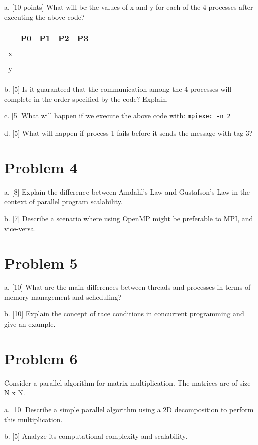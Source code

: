\documentclass{article}
\begin{document}
a. [10 points] What will be the values of x and y for each of the 4 processes after executing the above code?

\begin{tabular}{|c|c|c|c|c|}
\hline
 & P0 & P1 & P2 & P3 \\ \hline
x &  &  &  &  \\ \hline
y &  &  &  &  \\ \hline
\end{tabular}

b. [5]  Is it guaranteed that the communication among the 4 processes will complete in the order specified by the code?  Explain.

c. [5] What will happen if we execute the above code with: \texttt{mpiexec -n 2}

d. [5] What will happen if process 1 fails before it sends the message with tag 3?


\section*{Problem 4}
a. [8] Explain the difference between Amdahl's Law and Gustafson's Law in the context of parallel program scalability.

b. [7]  Describe a scenario where using OpenMP might be preferable to MPI, and vice-versa.


\section*{Problem 5}
a. [10] What are the main differences between threads and processes in terms of memory management and scheduling?

b. [10] Explain the concept of race conditions in concurrent programming and give an example.


\section*{Problem 6}
Consider a parallel algorithm for matrix multiplication.  The matrices are of size N x N.

a. [10] Describe a simple parallel algorithm using a 2D decomposition to perform this multiplication.

b. [5] Analyze its computational complexity and scalability.
\end{document}
